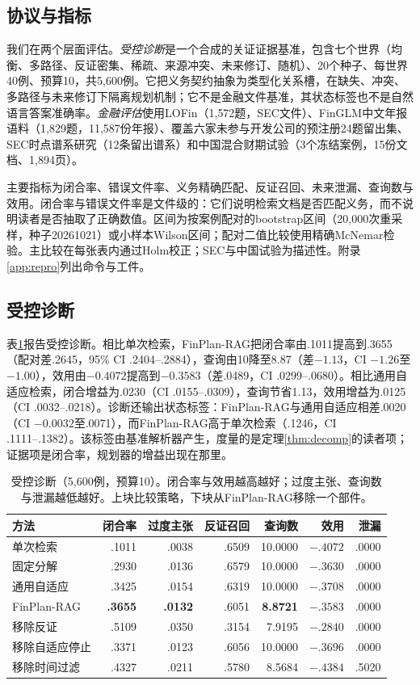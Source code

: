 \documentclass[10.5pt,a4paper]{ctexart}
\newcommand{\finplan}{FinPlan\mbox{-}RAG}
\begin{document}
\subsection{协议与指标}
我们在两个层面评估。\emph{受控诊断}是一个合成的关证证据基准，包含七个世界（均衡、多路径、反证密集、稀疏、来源冲突、未来修订、随机）、20个种子、每世界40例、预算10，共5{,}600例。它把义务契约抽象为类型化关系槽，在缺失、冲突、多路径与未来修订下隔离规划机制；它不是金融文件基准，其状态标签也不是自然语言答案准确率。\emph{金融评估}使用LOFin（1{,}572题，SEC文件）、FinGLM中文年报语料\citep{finglm2023}（1{,}829题，11{,}587份年报）、覆盖六家未参与开发公司的预注册24题留出集、SEC时点谱系研究（12条留出谱系）和中国混合财期试验（3个冻结案例，15份文档、1{,}894页）。

主要指标为闭合率、错误文件率、义务精确匹配、反证召回、未来泄漏、查询数与效用。闭合率与错误文件率是文件级的：它们说明检索文档是否匹配义务，而不说明读者是否抽取了正确数值。区间为按案例配对的bootstrap区间（20{,}000次重采样，种子20261021）或小样本Wilson区间；配对二值比较使用精确McNemar检验。主比较在每张表内通过Holm校正；SEC与中国试验为描述性。附录\ref{app:repro}列出命令与工件。

\subsection{受控诊断}
表\ref{tab:controlled}报告受控诊断。相比单次检索，\finplan{}把闭合率由.1011提高到.3655（配对差.2645，95\% CI .2404--.2884），查询由10降至8.87（差$-1.13$，CI $-1.26$至$-1.00$），效用由$-0.4072$提高到$-0.3583$（差.0489，CI .0299--.0680）。相比通用自适应检索，闭合增益为.0230（CI .0155--.0309），查询节省1.13，效用增益为.0125（CI .0032--.0218）。诊断还输出状态标签：\finplan{}与通用自适应相差.0020（CI $-0.0032$至.0071），而\finplan{}高于单次检索（.1246，CI .1111--.1382）。该标签由基准解析器产生，度量的是定理\ref{thm:decomp}的读者项；证据项是闭合率，规划器的增益出现在那里。

\begin{table}[t]\centering\small
\caption{受控诊断（5{,}600例，预算10）。闭合率与效用越高越好；过度主张、查询数与泄漏越低越好。上块比较策略，下块从\finplan{}移除一个部件。}
\label{tab:controlled}
\begin{tabular}{lrrrrrr}
\toprule
方法 & 闭合率 & 过度主张 & 反证召回 & 查询数 & 效用 & 泄漏\\
\midrule
单次检索 & .1011 & .0038 & .6509 & 10.0000 & $-.4072$ & .0000\\
固定分解 & .2930 & .0136 & .6579 & 10.0000 & $-.3630$ & .0000\\
通用自适应 & .3425 & .0154 & .6319 & 10.0000 & $-.3708$ & .0000\\
\finplan{} & \textbf{.3655} & \textbf{.0132} & .6051 & \textbf{8.8721} & $\mathbf{-.3583}$ & .0000\\
\midrule
移除反证 & .5109 & .0350 & .3154 & 7.9195 & $-.2840$ & .0000\\
移除自适应停止 & .3371 & .0123 & .6056 & 10.0000 & $-.3696$ & .0000\\
移除时间过滤 & .4327 & .0211 & .5780 & 8.5684 & $-.4384$ & .5020\\
\bottomrule
\end{tabular}
\end{table}
\end{document}
